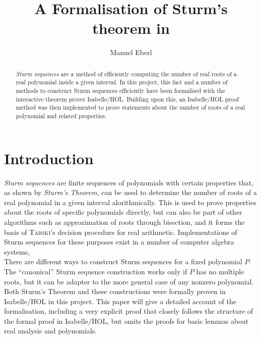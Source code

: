 \documentclass[11pt,a4paper,oneside]{article}
\title{A Formalisation of Sturm's theorem in \isabellehol}
\author{Manuel Eberl}
\newcommand{\isabellehol}{\mbox{Isabelle}\slash HOL\xspace}
\begin{document}
\maketitle

\begin{abstract}
\emph{Sturm sequences} are a method of efficiently computing the number of real roots of a real polynomial inside a given interval. In this project, this fact and a number of me\-thods to construct Sturm sequences efficiently have been formalised with the interactive theorem prover Isabelle\slash HOL. Buil\-ding upon this, an Isabelle\slash HOL proof method was then implemented to prove statements about the number of roots of a real polynomial and related properties.
\end{abstract}\vskip10mm

\tableofcontents
\newpage
\parindent0mm

\section{Introduction}
\emph{Sturm sequences} are finite sequences of polynomials with certain properties that, as shown by \emph{Sturm's Theorem}, can be used to determine the number of roots of a real polynomial in a given interval alorithmically. This is used to prove properties about the roots of specific polynomials directly, but can also be part of other algorithms such as approximation of roots through bisection, and it forms the basis of \textsc{Tarski}'s decision procedure for real arithmetic. Implementations of Sturm sequences for these purposes exist in a number of computer algebra systems, %
\\

There are different ways to construct Sturm sequences for a fixed polynomial $P$. The \enquote{canonical} Sturm sequence construction works only if $P$ has no multiple roots, but it can be adapter to the more general case of any nonzero polynomial.\\

Both Sturm's Theorem and these constructions were formally proven in \isabellehol in this project. This paper will give a detailed account of the formalisation, including a very explicit proof that closely follows the structure of the formal proof in \isabellehol, but omits the proofs for basic lemmas about real analysis and polynomials.\\
\end{document}
